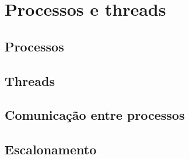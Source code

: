 \chapter{Processos e threads}\label{cap:ProcessosThreads}



\section{Processos}\label{sec:Processos}
\section{Threads}\label{sec:Threads}

\section{Comunicação entre processos}\label{sec:ComProc}

\section{Escalonamento}\label{sec:Escalonamento}